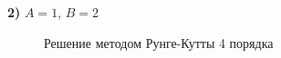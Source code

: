 	
		
		\newpage
		\thispagestyle{empty}
		\begin{landscape}
			\textbf{2)} $A = 1$, $B = 2$	
			\begin{figure}[h!]
				\begin{minipage}[h]{0.55\linewidth}
				\end{minipage}
				\hfill
				\begin{minipage}[h]{0.55\linewidth}
				\end{minipage}
				\caption{Решение методом Рунге-Кутты 4 порядка}
			\end{figure}
			\fillandplacepagenumber
		\end{landscape}
		
